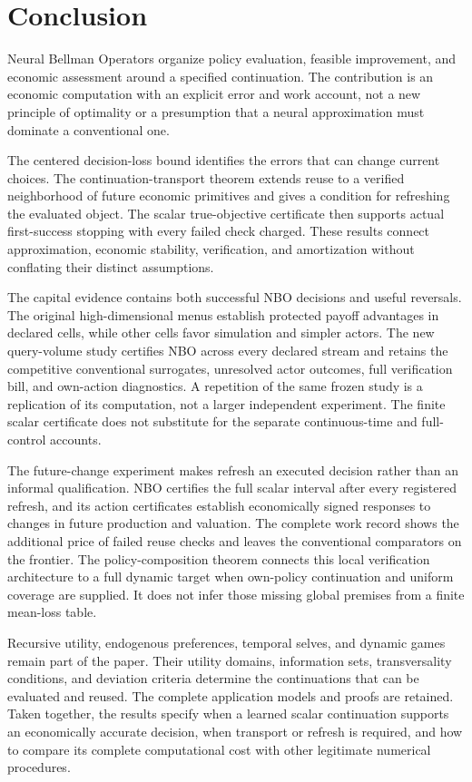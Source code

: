 \section{Conclusion}\label{sec:conclusion}
Neural Bellman Operators organize policy evaluation, feasible improvement,
and economic assessment around a specified continuation. The contribution
is an economic computation with an explicit error and work account, not a
new principle of optimality or a presumption that a neural approximation
must dominate a conventional one.

The centered decision-loss bound identifies the errors that can change
current choices. The continuation-transport theorem extends reuse to a
verified neighborhood of future economic primitives and gives a condition
for refreshing the evaluated object. The scalar true-objective certificate
then supports actual first-success stopping with every failed check charged.
These results connect approximation, economic stability, verification, and
amortization without conflating their distinct assumptions.

The capital evidence contains both successful NBO decisions and useful
reversals. The original high-dimensional menus establish protected payoff
advantages in declared cells, while other cells favor simulation and simpler
actors. The new query-volume study certifies NBO across every declared
stream and retains the competitive conventional surrogates, unresolved actor
outcomes, full verification bill, and own-action diagnostics. A repetition
of the same frozen study is a replication of its computation, not a larger
independent experiment. The finite scalar certificate does not substitute
for the separate continuous-time and full-control accounts.

The future-change experiment makes refresh an executed decision rather than
an informal qualification. NBO certifies the full scalar interval after every
registered refresh, and its action certificates establish economically signed
responses to changes in future production and valuation. The complete work
record shows the additional price of failed reuse checks and leaves the
conventional comparators on the frontier. The policy-composition theorem
connects this local verification architecture to a full dynamic target when
own-policy continuation and uniform coverage are supplied. It does not infer
those missing global premises from a finite mean-loss table.

Recursive utility, endogenous preferences, temporal selves, and dynamic
games remain part of the paper. Their utility domains, information sets,
transversality conditions, and deviation criteria determine the continuations
that can be evaluated and reused. The complete application models and proofs
are retained. Taken together, the results specify when a learned scalar
continuation supports an economically accurate decision, when transport or
refresh is required, and how to compare its complete computational cost with
other legitimate numerical procedures.
